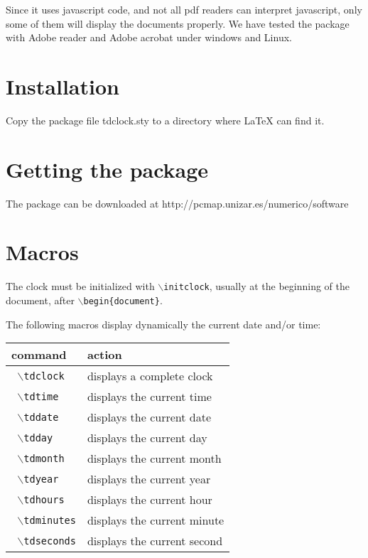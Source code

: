 \documentclass{article}
\begin{document}
Since it uses javascript code, and not all pdf readers can interpret javascript,
only some of them will display the documents properly.  We have tested the package with
Adobe reader and Adobe acrobat under windows and Linux.

\section{Installation}
Copy the package file tdclock.sty to a directory where \LaTeX\/ can find it.

\section{Getting the package}

The package can be downloaded at  http://pcmap.unizar.es/numerico/software

\section{Macros}

The clock must be initialized with  \texttt{$\backslash$initclock}, usually at the beginning of the document, after
\texttt{$\backslash$begin\{document\}}.

The following macros display dynamically the current date and/or time:

\begin{center}
\begin{tabular}{|l|l|}
\hline
 \bf command & \bf  action \\
\hline
\texttt{ $\backslash$tdclock}       & displays a complete clock  \\ \hline
\texttt{ $\backslash$tdtime}        & displays the current time    \\ \hline
\texttt{ $\backslash$tddate}        & displays the current date    \\ \hline
\texttt{ $\backslash$tdday}         & displays the current day     \\\hline
\texttt{ $\backslash$tdmonth}       & displays the current month   \\\hline
\texttt{ $\backslash$tdyear}        & displays the current year    \\\hline
\texttt{ $\backslash$tdhours}       & displays the current hour   \\\hline
\texttt{ $\backslash$tdminutes}     & displays the current minute \\\hline
\texttt{ $\backslash$tdseconds}     & displays the current second \\\hline
\end{tabular}
\end{center}
\end{document}
